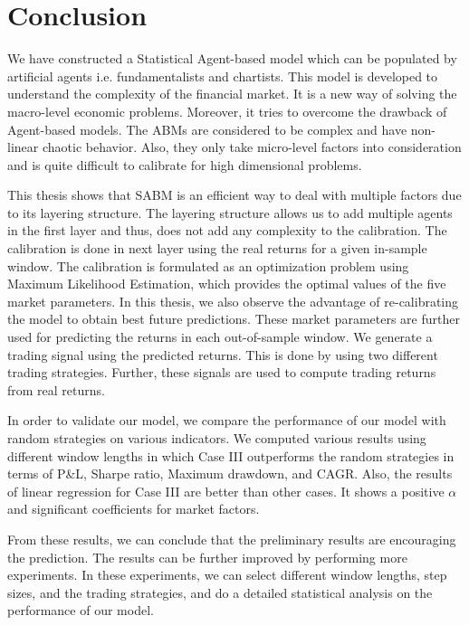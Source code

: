 
\chapter{Conclusion}
We have constructed a Statistical Agent-based model which can be populated by artificial agents i.e. fundamentalists and chartists. This model is developed to understand the complexity of the financial market. It is a new way of solving the macro-level economic problems. Moreover, it tries to overcome the drawback of  Agent-based models. The ABMs are considered to be complex and have non-linear chaotic behavior. Also, they only take micro-level factors into consideration and is quite difficult to calibrate for high dimensional problems.

This thesis shows that SABM is an efficient way to deal with multiple factors due to its layering structure. The layering structure allows us to add multiple agents in the first layer and thus, does not add any complexity to the calibration. The calibration is done in next layer using the real returns for a given in-sample window. The calibration is formulated as an optimization problem using Maximum Likelihood Estimation, which provides the optimal values of the five market parameters. In this thesis, we also observe the advantage of re-calibrating the model to obtain best future predictions. These market parameters are further used for predicting the returns in each out-of-sample window. We generate a trading signal using the predicted returns. This is done by using two different trading strategies. Further, these signals are used to compute trading returns from real returns. 

In order to validate our model, we compare the performance of our model with random strategies on various indicators. We computed various results using different window lengths in which Case III outperforms the random strategies in terms of P\&L, Sharpe ratio, Maximum drawdown, and CAGR. Also, the results of linear regression for Case III are better than other cases. It shows a positive $\alpha$ and significant coefficients for market factors. 

From these results, we can conclude that the preliminary results are encouraging the prediction. The results can be further improved by performing more experiments. In these experiments, we can select different window lengths, step sizes, and the trading strategies, and do a detailed statistical analysis on the performance of our model.